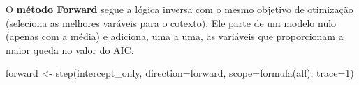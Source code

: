 \documentclass[
  letterpaper,
  DIV=11,
  numbers=noendperiod]{scrartcl}
\newenvironment{Shaded}{\begin{snugshade}}{\end{snugshade}}
\newcommand{\AttributeTok}[1]{\textcolor[rgb]{0.40,0.45,0.13}{#1}}
\newcommand{\DecValTok}[1]{\textcolor[rgb]{0.68,0.00,0.00}{#1}}
\newcommand{\FunctionTok}[1]{\textcolor[rgb]{0.28,0.35,0.67}{#1}}
\newcommand{\NormalTok}[1]{\textcolor[rgb]{0.00,0.23,0.31}{#1}}
\newcommand{\OtherTok}[1]{\textcolor[rgb]{0.00,0.23,0.31}{#1}}
\newcommand{\StringTok}[1]{\textcolor[rgb]{0.13,0.47,0.30}{#1}}
\begin{document}
O \textbf{método Forward} segue a lógica inversa com o mesmo objetivo de
otimização (seleciona as melhores varáveis para o cotexto). Ele parte de
um modelo nulo (apenas com a média) e adiciona, uma a uma, as variáveis
que proporcionam a maior queda no valor do AIC.

\begin{Shaded}
\begin{Highlighting}[]
\NormalTok{forward }\OtherTok{\textless{}{-}} \FunctionTok{step}\NormalTok{(intercept\_only, }\AttributeTok{direction=}\StringTok{\textquotesingle{}forward\textquotesingle{}}\NormalTok{, }\AttributeTok{scope=}\FunctionTok{formula}\NormalTok{(all), }\AttributeTok{trace=}\DecValTok{1}\NormalTok{)}
\end{Highlighting}
\end{Shaded}
\end{document}
